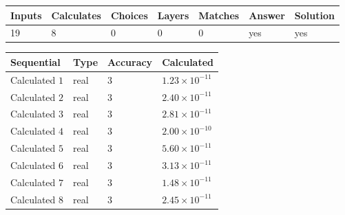 \documentclass[12pt]{article}
\begin{document}
 

 
\vspace{0.3in}
   
   
   
   
\noindent\begin{tabular}{|l|l|l|l|l|l|l|}
 \hline
Inputs & Calculates & Choices & Layers & Matches & Answer & Solution \\ \hline
          19  & 
           8  & 
           0
  & 
           0  & 
           0  & 
  yes & 
  yes 
  \\ \hline
 \end{tabular}
   
   
   
   
\noindent{}
   
   
  
  
\noindent\begin{tabular}{|l|l|l|l|}
\hline
 Sequential & Type & Accuracy & Calculated \\ 
\hline
 
 
  Calculated $            1 $ & real & $            3  $ & 
 $ 1.23 \times 10^{-11} $ 
 \\  \hline  
 
 
  Calculated $            2 $ & real & $            3  $ & 
 $ 2.40 \times 10^{-11} $ 
 \\  \hline  
 
 
  Calculated $            3 $ & real & $            3  $ & 
 $ 2.81 \times 10^{-11} $ 
 \\  \hline  
 
 
  Calculated $            4 $ & real & $            3  $ & 
 $ 2.00 \times 10^{-10} $ 
 \\  \hline  
 
 
  Calculated $            5 $ & real & $            3  $ & 
 $ 5.60 \times 10^{-11} $ 
 \\  \hline  
 
 
  Calculated $            6 $ & real & $            3  $ & 
 $ 3.13 \times 10^{-11} $ 
 \\  \hline  
 
 
  Calculated $            7 $ & real & $            3  $ & 
 $ 1.48 \times 10^{-11} $ 
 \\  \hline  
 
 
  Calculated $            8 $ & real & $            3  $ & 
 $ 2.45 \times 10^{-11} $ 
 \\  \hline  
 \end{tabular}
   
\end{document}
